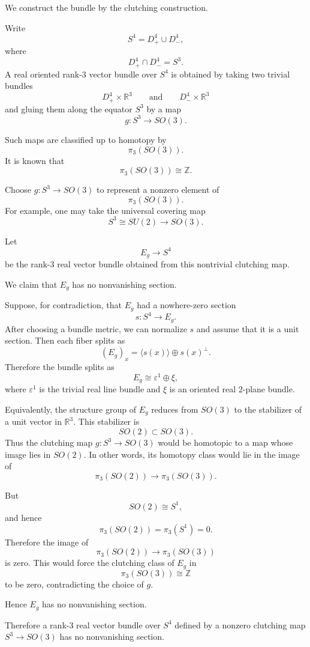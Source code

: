 \begin{solution}
We construct the bundle by the clutching construction.

Write
\[
S^4=D^4_+\cup D^4_-,
\]
where
\[
D^4_+\cap D^4_-=S^3.
\]
A real oriented rank-\(3\) vector bundle over \(S^4\) is obtained by taking two
trivial bundles
\[
D^4_+\times \mathbb R^3
\qquad\text{and}\qquad
D^4_-\times \mathbb R^3
\]
and gluing them along the equator \(S^3\) by a map
\[
g:S^3\to SO(3).
\]

Such maps are classified up to homotopy by
\[
\pi_3(SO(3)).
\]
It is known that
\[
\pi_3(SO(3))\cong \mathbb Z.
\]

Choose \(g:S^3\to SO(3)\) to represent a nonzero element of
\[
\pi_3(SO(3)).
\]
For example, one may take the universal covering map
\[
S^3\cong SU(2)\longrightarrow SO(3).
\]

Let
\[
E_g\to S^4
\]
be the rank-\(3\) real vector bundle obtained from this nontrivial clutching map.

We claim that \(E_g\) has no nonvanishing section.

Suppose, for contradiction, that \(E_g\) had a nowhere-zero section
\[
s:S^4\to E_g.
\]
After choosing a bundle metric, we can normalize \(s\) and assume that it is a
unit section. Then each fiber splits as
\[
(E_g)_x
=
\langle s(x)\rangle\oplus s(x)^\perp.
\]
Therefore the bundle splits as
\[
E_g\cong \varepsilon^1\oplus \xi,
\]
where \(\varepsilon^1\) is the trivial real line bundle and \(\xi\) is an
oriented real \(2\)-plane bundle.

Equivalently, the structure group of \(E_g\) reduces from \(SO(3)\) to the
stabilizer of a unit vector in \(\mathbb R^3\). This stabilizer is
\[
SO(2)\subset SO(3).
\]
Thus the clutching map \(g:S^3\to SO(3)\) would be homotopic to a map whose image
lies in \(SO(2)\). In other words, its homotopy class would lie in the image of
\[
\pi_3(SO(2))\longrightarrow \pi_3(SO(3)).
\]

But
\[
SO(2)\cong S^1,
\]
and hence
\[
\pi_3(SO(2))=\pi_3(S^1)=0.
\]
Therefore the image of
\[
\pi_3(SO(2))\to \pi_3(SO(3))
\]
is zero. This would force the clutching class of \(E_g\) in
\[
\pi_3(SO(3))\cong \mathbb Z
\]
to be zero, contradicting the choice of \(g\).

Hence \(E_g\) has no nonvanishing section.

Therefore a rank-\(3\) real vector bundle over \(S^4\) defined by a
nonzero clutching map \(S^3\to SO(3)\) has no nonvanishing section.
\end{solution}

